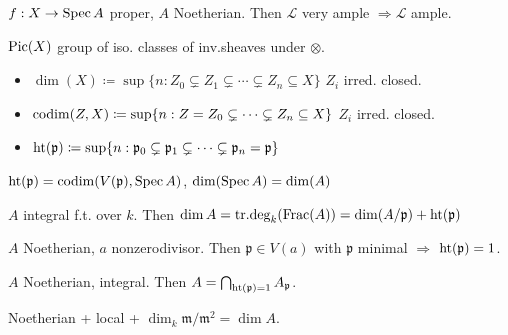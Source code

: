 \begin{proposition} $f : X \to \operatorname{Spec} A $ proper, $A$ Noetherian. Then $\mathcal{L} $ very ample $ \Rightarrow \mathcal{L} $ ample.
\end{proposition}

\begin{definition}$\operatorname{Pic}(X)$ group of iso. classes of inv.sheaves under $ \otimes $.
\end{definition}

\begin{definition}[Dimensions]
    \begin{itemize}[topsep=-6pt, itemsep=0pt]
        \item $\dim (X) \coloneqq \sup \{ n : Z_0 \subsetneq Z_1 \subsetneq \cdots  \subsetneq Z_n \subseteq X \} $ $Z_i$ irred. closed.
        \item $\operatorname{codim} (Z, X) \coloneqq \sup \{ n : Z = Z_0 \subsetneq \cdots  \subsetneq Z_n \subseteq X \} $ $Z_i$ irred. closed.
        \item $\operatorname{ht} (\mathfrak{p}) \coloneqq \sup \{ n : \mathfrak{p}_0 \subsetneq \mathfrak{p}_1 \subsetneq \cdots  \subsetneq \mathfrak{p}_n = \mathfrak{p}\}$
    \end{itemize}
\end{definition}

\begin{proposition}
$\operatorname{ht} (\mathfrak{p}) = \operatorname{codim}(V(\mathfrak{p}), \operatorname{Spec} A)$, $\dim (\operatorname{Spec} A) = \dim (A)$
\end{proposition}

\begin{proposition} $A$ integral f.t. over $k$. Then $\dim A = \text{tr.deg}_k (\text{Frac}(A)) = \dim (A/\mathfrak{p}) + \operatorname{ht} (\mathfrak{p})$
\end{proposition}

\begin{proposition}  $A$ Noetherian, $a$ nonzerodivisor. Then $\mathfrak{p} \in V(a)$ with $\mathfrak{p}$ minimal $ \Rightarrow $ $\operatorname{ht} (\mathfrak{p}) = 1$.
\end{proposition}

\begin{proposition} $A$ Noetherian, integral. Then $A = \bigcap_{\operatorname{ht} (\mathfrak{p}) = 1} A_{\mathfrak{p}}$.
\end{proposition}

\begin{definition}[Regular] Noetherian + local + $\dim_{k} \mathfrak{m}/\mathfrak{m}^2 = \dim A$.
\end{definition}

